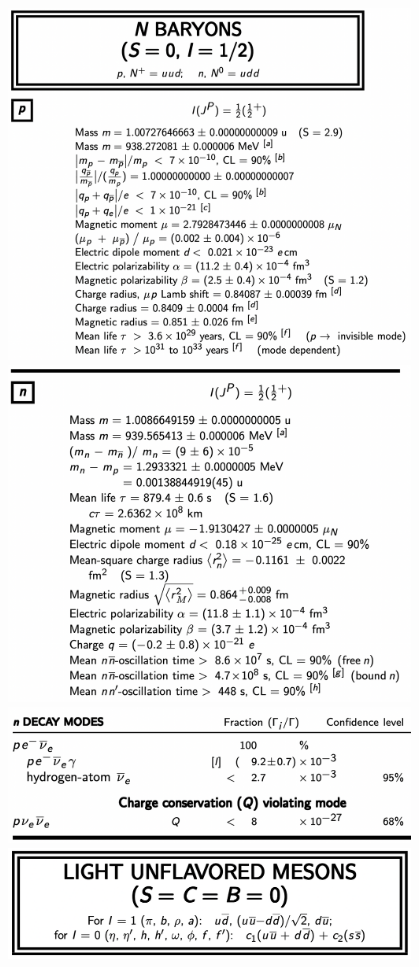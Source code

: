 \begin{center}
\includegraphics[width=0.8\textwidth]{PDG/N_BARYONS_AND_PROTON.png}
\includegraphics[width=0.8\textwidth]{PDG/neutron.png}
\includegraphics[width=0.8\textwidth]{PDG/neutron_DECAY_MODES.png}
\includegraphics[width=0.8\textwidth]{PDG/LIGHT_UNFLAVOURED_MESONS.png}

\end{center}

